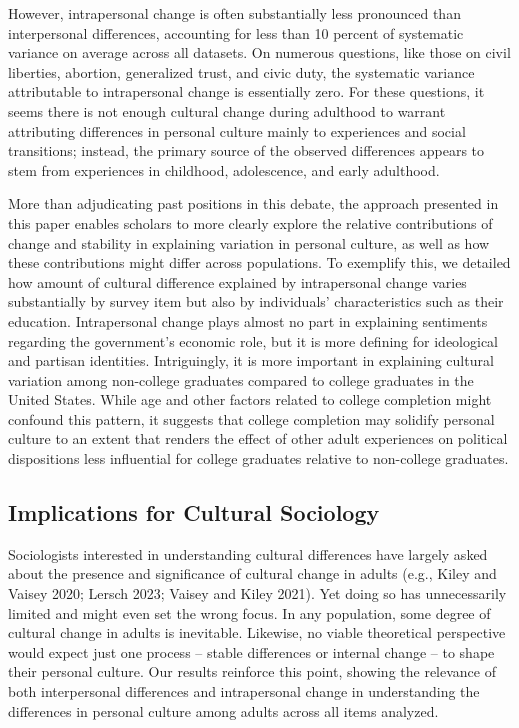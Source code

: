 \documentclass[
  12pt,
]{article}
\begin{document}
However, intrapersonal change is often substantially less pronounced
than interpersonal differences, accounting for less than 10 percent of
systematic variance on average across all datasets. On numerous
questions, like those on civil liberties, abortion, generalized trust,
and civic duty, the systematic variance attributable to intrapersonal
change is essentially zero. For these questions, it seems there is not
enough cultural change during adulthood to warrant attributing
differences in personal culture mainly to experiences and social
transitions; instead, the primary source of the observed differences
appears to stem from experiences in childhood, adolescence, and early
adulthood.

More than adjudicating past positions in this debate, the approach
presented in this paper enables scholars to more clearly explore the
relative contributions of change and stability in explaining variation
in personal culture, as well as how these contributions might differ
across populations. To exemplify this, we detailed how amount of
cultural difference explained by intrapersonal change varies
substantially by survey item but also by individuals' characteristics
such as their education. Intrapersonal change plays almost no part in
explaining sentiments regarding the government's economic role, but it
is more defining for ideological and partisan identities. Intriguingly,
it is more important in explaining cultural variation among non-college
graduates compared to college graduates in the United States. While age
and other factors related to college completion might confound this
pattern, it suggests that college completion may solidify personal
culture to an extent that renders the effect of other adult experiences
on political dispositions less influential for college graduates
relative to non-college graduates.

\hypertarget{implications-for-cultural-sociology}{%
\subsection{Implications for Cultural
Sociology}\label{implications-for-cultural-sociology}}

Sociologists interested in understanding cultural differences have
largely asked about the presence and significance of cultural change in
adults (e.g., Kiley and Vaisey 2020; Lersch 2023; Vaisey and Kiley
2021). Yet doing so has unnecessarily limited and might even set the
wrong focus. In any population, some degree of cultural change in adults
is inevitable. Likewise, no viable theoretical perspective would expect
just one process -- stable differences or internal change -- to shape
their personal culture. Our results reinforce this point, showing the
relevance of both interpersonal differences and intrapersonal change in
understanding the differences in personal culture among adults across
all items analyzed.
\end{document}
